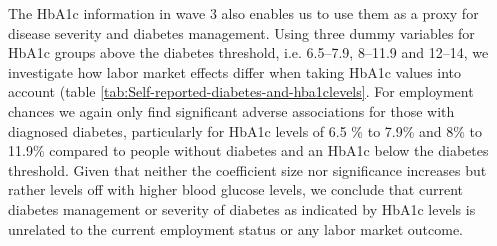 \documentclass[12pt,english,british]{article}
\begin{document}
The \ac{HbA1c} information in wave 3 also enables us to use them as a proxy for disease
severity and diabetes management. Using three dummy variables for \ac{HbA1c} groups above the
diabetes threshold, i.e. 6.5--7.9, 8--11.9 and 12--14, we investigate
how labor market effects differ when taking \ac{HbA1c} values
into account (table \ref{tab:Self-reported-diabetes-and-hba1clevels}. For employment chances
we again only find significant adverse associations for
those with diagnosed diabetes, particularly for \ac{HbA1c} levels of 6.5 \% to 7.9\%
and 8\% to 11.9\% compared to people without diabetes and an \ac{HbA1c} below the
diabetes threshold. Given that neither the coefficient size nor significance increases but rather levels off with higher blood glucose levels, we conclude that current diabetes management or severity of diabetes as indicated by \ac{HbA1c} levels is unrelated to the current employment status or any labor market outcome.
\end{document}
